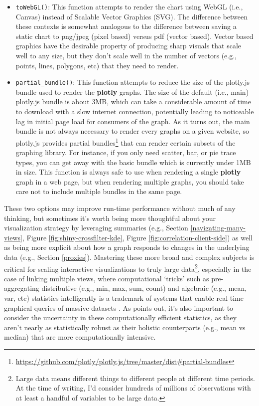 \documentclass[
  12pt,
]{krantz}
\renewcommand{\href}[2]{#2\footnote{\url{#1}}}
\begin{document}
\begin{itemize}
\item
  \texttt{toWebGL()}: This function attempts to render the chart using WebGL (i.e., Canvas) instead of Scalable Vector Graphics (SVG). The difference between these contexts is somewhat analogous to the difference between saving a static chart to png/jpeg (pixel based) versus pdf (vector based). Vector based graphics have the desirable property of producing sharp visuals that scale well to any size, but they don't scale well in the number of vectors (e.g., points, lines, polygons, etc) that they need to render.
\item
  \texttt{partial\_bundle()}: This function attempts to reduce the size of the plotly.js bundle used to render the \textbf{plotly} graphs. The size of the default (i.e., main) plotly.js bundle is about 3MB, which can take a considerable amount of time to download with a slow internet connection, potentially leading to noticeable lag in initial page load for consumers of the graph. As it turns out, the main bundle is not always necessary to render every graphs on a given website, so plotly.js provides \href{https://github.com/plotly/plotly.js/tree/master/dist\#partial-bundles}{partial bundles} that can render certain subsets of the graphing library. For instance, if you only need scatter, bar, or pie trace types, you can get away with the basic bundle which is currently under 1MB in size. This function is always safe to use when rendering a single \textbf{plotly} graph in a web page, but when rendering multiple graphs, you should take care not to include multiple bundles in the same page.
\end{itemize}

These two options may improve run-time performance without much of any thinking, but sometimes it's worth being more thoughtful about your visualization strategy by leveraging summaries (e.g., Section \ref{navigating-many-views}, Figure \ref{fig:shiny-crossfilter-kde}, Figure \ref{fig:correlation-client-side}) as well as being more explicit about how a graph responds to changes in the underlying data (e.g., Section \ref{proxies}). Mastering these more broad and complex subjects is critical for scaling interactive visualizations to truly large data\footnote{Large data means different things to different people at different time periods. At the time of writing, I'd consider hundreds of millions of observations with at least a handful of variables to be large data.}, especially in the case of linking multiple views, where computational `tricks' such as pre-aggregating distributive (e.g., min, max, sum, count) and algebraic (e.g., mean, var, etc) statistics intelligently is a trademark of systems that enable real-time graphical queries of massive datasets \citep{2013-immens, nanocubes, 2019-falcon}. As \citet{bigvis} points out, it's also important to consider the uncertainty in these computationally efficient statistics, as they aren't nearly as statistically robust as their holistic counterparts (e.g., mean vs median) that are more computationally intensive.
\end{document}
